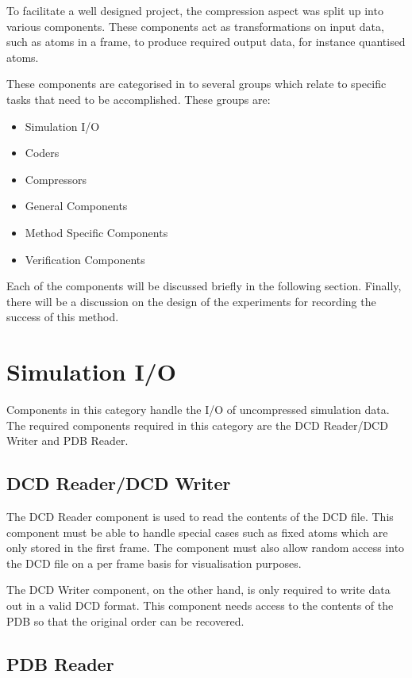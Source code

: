 \documentclass[a4paper,11pt]{report}
\begin{document}
To facilitate a well designed project, the compression aspect was split up into various components. These components act as transformations on input data, such as atoms in a frame, to produce required output data, for instance quantised atoms.

These components are categorised in to several groups which relate to specific tasks that need to be accomplished. These groups are:

\begin{itemize}
 \item Simulation I/O
 \item Coders
 \item Compressors
 \item General Components
 \item Method Specific Components
 \item Verification Components
\end{itemize}

Each of the components will be discussed briefly in the following section. Finally, there will be a discussion on the design of the experiments for recording the success of this method.

\section{Simulation I/O}

Components in this category handle the I/O of uncompressed simulation data. The required components required in this category are the DCD Reader/DCD Writer and PDB Reader.

\subsection{DCD Reader/DCD Writer}

The DCD Reader component is used to read the contents of the DCD file. This component must be able to handle special cases such as fixed atoms which are only stored in the first frame. The component must also allow random access into the DCD file on a per frame basis for visualisation purposes.

The DCD Writer component, on the other hand, is only required to write data out in a valid DCD format. This component needs access to the contents of the PDB so that the original order can be recovered.

\subsection{PDB Reader}
\end{document}
